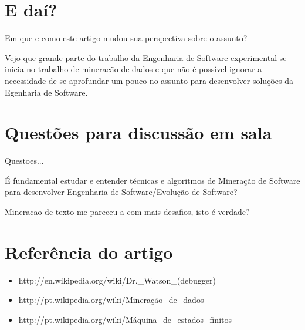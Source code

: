 \documentclass{article}
\begin{document}
\section{E daí?}

Em que e como este artigo mudou sua perspectiva sobre o assunto?

Vejo que grande parte do trabalho da Engenharia de Software experimental se inicia no trabalho de mineracão de dados e que não é possível ignorar a necessidade de se aprofundar um pouco no assunto para desenvolver soluções da Egenharia de Software.

\section{Questões para discussão em sala}

Questoes...

É fundamental estudar e entender técnicas e algoritmos de Mineração de Software para desenvolver Engenharia de Software/Evolução de Software?

Mineracao de texto me pareceu a com mais desafios, isto é verdade?

\section{Referência do artigo}

\begin{itemize}
\item http://en.wikipedia.org/wiki/Dr.\_Watson\_(debugger)
\item http://pt.wikipedia.org/wiki/Mineração\_de\_dados
\item http://pt.wikipedia.org/wiki/Máquina\_de\_estados\_finitos
\end{itemize}
\end{document}

